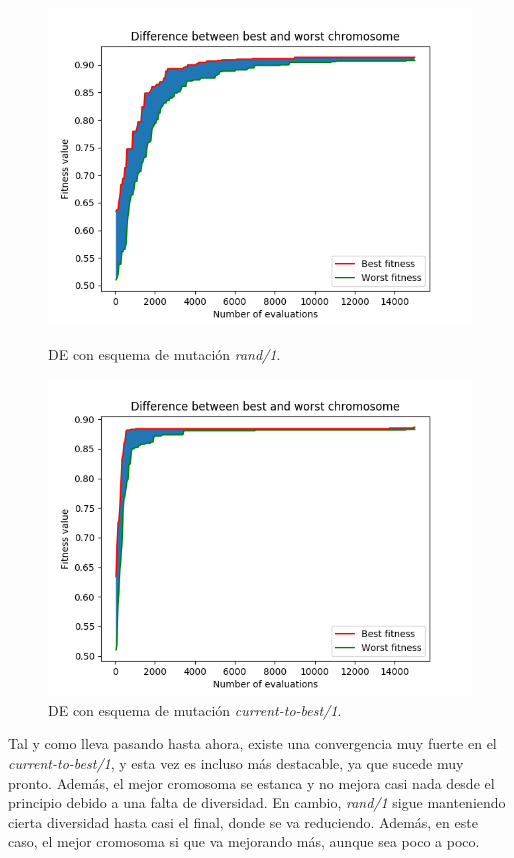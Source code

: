 \documentclass[11pt,a4paper]{article}
\begin{document}
\begin{figure}[H]
\centering
\begin{minipage}{.5\textwidth}
	\centering
	\includegraphics[scale=0.4]{img/texture-de-rand.png}
	\caption{DE con esquema de mutación \textit{rand/1}.}
\end{minipage}%
\begin{minipage}{.5\textwidth}
	\centering
	\includegraphics[scale=0.4]{img/texture-de-best.png}
	\caption{DE con esquema de mutación \textit{current-to-best/1}.}
\end{minipage}
\end{figure}

Tal y como lleva pasando hasta ahora, existe una convergencia muy fuerte en el \textit{current-to-best/1}, y esta vez es
incluso más destacable, ya que sucede muy pronto. Además, el mejor cromosoma se estanca y no mejora casi nada desde el principio
debido a una falta de diversidad. En cambio, \textit{rand/1} sigue manteniendo cierta diversidad hasta casi el final, donde se
va reduciendo. Además, en este caso, el mejor cromosoma si que va mejorando más, aunque sea poco a poco.
\end{document}
